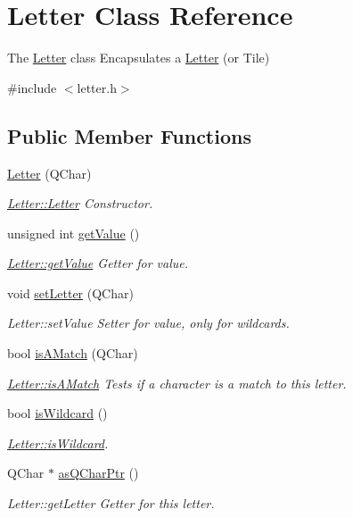 \hypertarget{class_letter}{\section{Letter Class Reference}
\label{class_letter}
}


The \hyperlink{class_letter}{Letter} class Encapsulates a \hyperlink{class_letter}{Letter} (or Tile)  




{\ttfamily \#include $<$letter.\-h$>$}

\subsection*{Public Member Functions}
\begin{DoxyCompactItemize}
\item 
\hyperlink{class_letter_aeaf51ffac3bafca1b1cc504381a6152f}{Letter} (Q\-Char)
\begin{DoxyCompactList}\small\item\em \hyperlink{class_letter_aeaf51ffac3bafca1b1cc504381a6152f}{Letter\-::\-Letter} Constructor. \end{DoxyCompactList}\item 
unsigned int \hyperlink{class_letter_a5980d43229d58bfab9fdb20f25e88e9e}{get\-Value} ()
\begin{DoxyCompactList}\small\item\em \hyperlink{class_letter_a5980d43229d58bfab9fdb20f25e88e9e}{Letter\-::get\-Value} Getter for value. \end{DoxyCompactList}\item 
void \hyperlink{class_letter_a9f2f4067a9fd386366273af73fac70e5}{set\-Letter} (Q\-Char)
\begin{DoxyCompactList}\small\item\em Letter\-::set\-Value Setter for value, only for wildcards. \end{DoxyCompactList}\item 
bool \hyperlink{class_letter_a7e6053ff071263d8bc876d31101ea235}{is\-A\-Match} (Q\-Char)
\begin{DoxyCompactList}\small\item\em \hyperlink{class_letter_a7e6053ff071263d8bc876d31101ea235}{Letter\-::is\-A\-Match} Tests if a character is a match to this letter. \end{DoxyCompactList}\item 
bool \hyperlink{class_letter_aa0c05656947c35b032b20b7260f463ba}{is\-Wildcard} ()
\begin{DoxyCompactList}\small\item\em \hyperlink{class_letter_aa0c05656947c35b032b20b7260f463ba}{Letter\-::is\-Wildcard}. \end{DoxyCompactList}\item 
Q\-Char $\ast$ \hyperlink{class_letter_aa7fb6547b5ceefef8d0a014ab0a80d08}{as\-Q\-Char\-Ptr} ()
\begin{DoxyCompactList}\small\item\em Letter\-::get\-Letter Getter for this letter. \end{DoxyCompactList}\end{DoxyCompactItemize}
